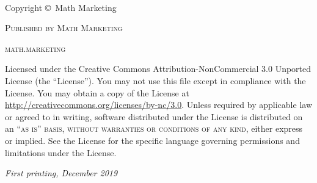 \newpage
~\vfill
\thispagestyle{empty}
\NoBgThispage

\noindent \textcolor{DarkPurple}{Copyright \copyright\ Math Marketing\\} %

\noindent \textcolor{DarkPurple}{\textsc{Published by Math Marketing}\\} %

\noindent \textcolor{DarkPurple}{\textsc{math.marketing}\\} %

\noindent \textcolor{DarkPurple}{Licensed under the Creative Commons Attribution-NonCommercial 3.0 Unported License (the ``License''). You may not use this file except in compliance with the License. You may obtain a copy of the License at \url{http://creativecommons.org/licenses/by-nc/3.0}. Unless required by applicable law or agreed to in writing, software distributed under the License is distributed on an \textsc{``as is'' basis, without warranties or conditions of any kind}, either express or implied. See the License for the specific language governing permissions and limitations under the License.\\} %

\noindent \textcolor{DarkPurple}{\textit{First printing, December 2019}} %